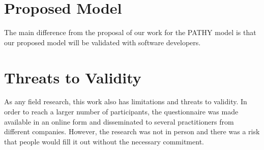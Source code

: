 \documentclass[conference]{IEEEtran}
\begin{document}

%
%

\section{Proposed Model}
\label{empathy}

The main difference from the proposal of our work for the PATHY model is that our proposed model will be validated with software developers.

\section{Threats to Validity}
\label{thread}


As any field research, this work also has limitations and threats to validity. In order to reach a larger number of participants, the questionnaire was made available in an online form and disseminated to several practitioners from different companies. However, the research was not in person and there was a risk that people would fill it out without the necessary commitment.

\end{document}
